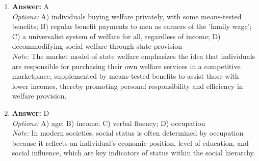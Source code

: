 \documentclass[12pt]{article}
\begin{document}
\begin{enumerate}[label=\arabic*.]
\item \textbf{Answer:} A
\\ \textit{Options:} A) individuals buying welfare privately, with some means-tested benefits; B) regular benefit payments to men as earners of the 'family wage'; C) a universalist system of welfare for all, regardless of income; D) decommodifying social welfare through state provision
\\ \textit{Note:} The market model of state welfare emphasizes the idea that individuals are responsible for purchasing their own welfare services in a competitive marketplace, supplemented by means-tested benefits to assist those with lower incomes, thereby promoting personal responsibility and efficiency in welfare provision.
\item \textbf{Answer:} D
\\ \textit{Options:} A) age; B) income; C) verbal fluency; D) occupation
\\ \textit{Note:} In modern societies, social status is often determined by occupation because it reflects an individual's economic position, level of education, and social influence, which are key indicators of status within the social hierarchy.
\end{enumerate}
\end{document}
